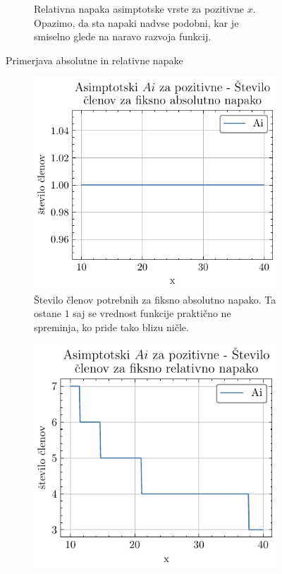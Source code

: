 \documentclass[slovene,11pt,a4paper]{article}
\begin{document}
\begin{figure}[H]
\begin{subfigure}{0.48\textwidth}
    \caption{Relativna napaka asimptotske vrste za pozitivne $x$. Opazimo, da sta napaki nadvse podobni, kar je smiselno glede na naravo razvoja funkcij.}
    \label{fig:b}
  \end{subfigure}
  \caption{Primerjava absolutne in relativne napake}
  \label{fig: 1}
\end{figure}


\begin{figure}[ht]
  \begin{subfigure}{0.48\textwidth}
    \centering
    \includegraphics[width=\linewidth]{graphs/pos_abs_err_n_ai.pdf}
    \caption{Število členov potrebnih za fiksno absolutno napako. Ta ostane $1$ saj se vrednost funkcije praktično ne spreminja, ko pride tako blizu ničle.}
    \label{fig:c}
  \end{subfigure}\hfill
  \begin{subfigure}{0.48\textwidth}
    \centering
    \includegraphics[width=\linewidth]{graphs/pos_rel_err_n_ai.pdf}

\end{subfigure}
\end{figure}
\end{document}
